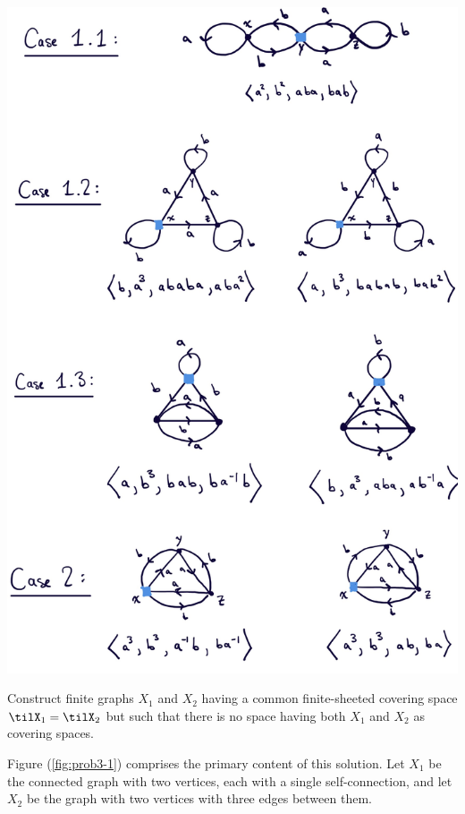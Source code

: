 \begin{homework}[e]
\begin{prf}
    \begin{center}
      \includegraphics[width=14cm]{figures/hwk6-fig5.png}
      \label{fig:prob2-2}
    \end{center}

  \end{prf}
   Construct finite graphs $X_1$ and $X_2$ having a common finite-sheeted covering space $\tilX_1 = \tilX_2$ but such that there is no space having both $X_1$ and $X_2$ as covering spaces.
  \begin{prf}
    Figure (\ref{fig:prob3-1}) comprises the primary content of this solution. Let $X_1$ be the connected graph with two vertices, each with a single self-connection, and let $X_2$ be the graph with two vertices with three edges between them. 


\end{prf}
\end{homework}

